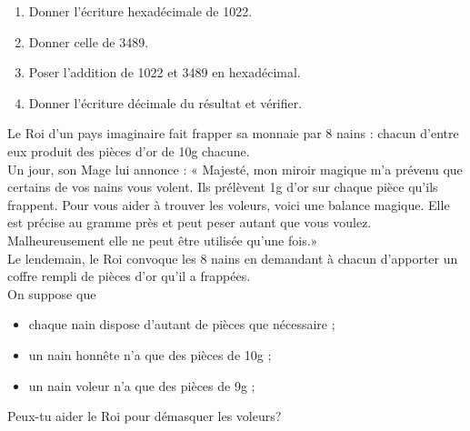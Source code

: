 \begin{exercice}
    \begin{enumerate}
        \item 	Donner l'écriture hexadécimale de 1022.
        \item 	Donner celle de 3489.
        \item 	Poser l'addition de 1022 et 3489 en hexadécimal.
        \item 	Donner l'écriture décimale du résultat et vérifier.
    \end{enumerate}
\end{exercice}

\begin{exercice}[*]
    Le Roi d'un pays imaginaire fait frapper sa monnaie par 8 nains : chacun d'entre eux produit des pièces d'or de 10g chacune.\\
    
    Un jour, son Mage lui annonce : « Majesté, mon miroir magique m'a prévenu que certains de vos nains vous volent. Ils prélèvent 1g d'or sur chaque pièce qu'ils frappent. Pour vous aider à trouver les voleurs, voici une balance magique. Elle est précise au gramme près et peut peser autant que vous voulez. Malheureusement elle ne peut être utilisée qu'une fois.»\\
    
    Le lendemain, le Roi convoque les 8 nains en demandant à chacun d'apporter un coffre rempli de pièces d'or qu'il a frappées.\\
    On suppose que 
    \begin{itemize}
        \item chaque nain dispose d'autant de pièces que nécessaire ;
        \item un nain honnête n'a que des pièces de 10g ;
        \item un nain voleur n'a que des pièces de 9g ;
    \end{itemize}
    
    Peux-tu aider le Roi pour démasquer les voleurs? 
    \end{exercice}